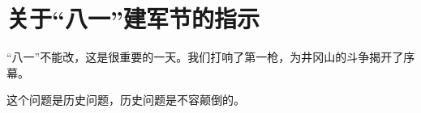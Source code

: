 \section[关于“八一”建军节的指示（一九六七年七月）]{关于“八一”建军节的指示}


“八一”不能改，这是很重要的一天。我们打响了第一枪，为井冈山的斗争揭开了序幕。

这个问题是历史问题，历史问题是不容颠倒的。

